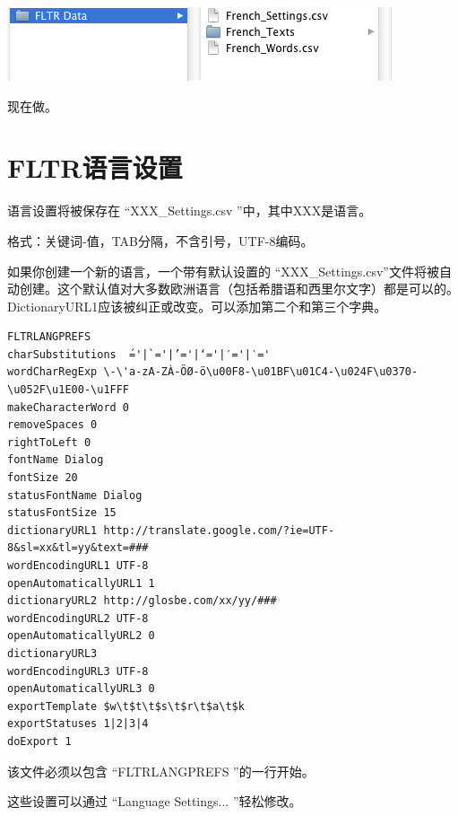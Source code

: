 \documentclass[cn,10pt,math=newtx,citestyle=gb7714-2015,bibstyle=gb7714-2015]{elegantbook}
\begin{document}
\includegraphics[scale=0.6]{image/images-026.png}

现在做。


\chapter{FLTR语言设置}
\label{FLTR语言设置}
语言设置将被保存在 “XXX\_Settings.csv ”中，其中XXX是语言。

格式：关键词-值，TAB分隔，不含引号，UTF-8编码。

如果你创建一个新的语言，一个带有默认设置的 “XXX\_Settings.csv”文件将被自动创建。这个默认值对大多数欧洲语言（包括希腊语和西里尔文字）都是可以的。
DictionaryURL1应该被纠正或改变。可以添加第二个和第三个字典。

\lstset{showstringspaces=false} %
\begin{lstlisting}
FLTRLANGPREFS
charSubstitutions  ́='|`='|’='|‘='|′='|‵='
wordCharRegExp \-\'a-zA-ZÀ-ÖØ-ö\u00F8-\u01BF\u01C4-\u024F\u0370-\u052F\u1E00-\u1FFF
makeCharacterWord 0
removeSpaces 0
rightToLeft 0
fontName Dialog
fontSize 20
statusFontName Dialog
statusFontSize 15
dictionaryURL1 http://translate.google.com/?ie=UTF-8&sl=xx&tl=yy&text=###
wordEncodingURL1 UTF-8
openAutomaticallyURL1 1
dictionaryURL2 http://glosbe.com/xx/yy/###
wordEncodingURL2 UTF-8
openAutomaticallyURL2 0
dictionaryURL3
wordEncodingURL3 UTF-8
openAutomaticallyURL3 0
exportTemplate $w\t$t\t$s\t$r\t$a\t$k
exportStatuses 1|2|3|4
doExport 1
\end{lstlisting}

该文件必须以包含 “FLTRLANGPREFS ”的一行开始。



这些设置可以通过 “Language Settings... ”轻松修改。
\end{document}
